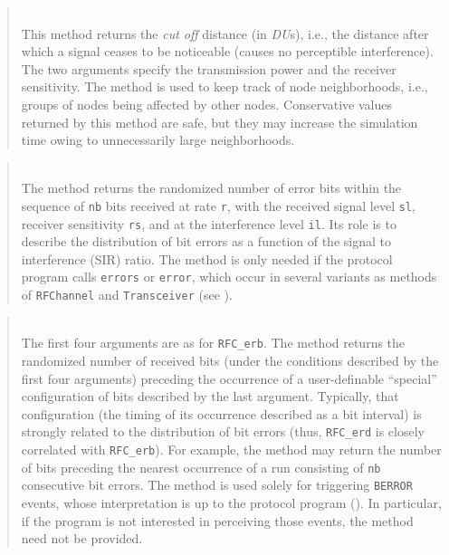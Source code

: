 \begin{quote}
\noindent{} \hspace{0in}\vspace{0.05in}\\
\noindent
This method returns the {\em cut off\/} distance (in {\em DU\/}s), i.e., the
distance after which a signal ceases to be noticeable (causes no perceptible
interference).
The two arguments specify the transmission power and the receiver sensitivity.
The method is used to keep track of node neighborhoods, i.e., groups of nodes
being affected by other nodes.
Conservative values returned by this method are safe, but they may increase
the simulation time owing to unnecessarily large neighborhoods.
\end{quote}

\begin{quote}
\noindent{} \hspace{0in}\vspace{0.05in}\\
\noindent
The method returns the randomized number of error bits within the sequence of
{\tt nb} bits received at rate {\tt r}, with the received signal level
{\tt sl}, receiver sensitivity {\tt rs}, and at the interference
level {\tt il}.
Its role is to describe the distribution of bit errors as a function of the
signal to interference (SIR) ratio.
The method is only needed if the protocol program calls
{\tt errors} or {\tt error}, which occur in several variants as methods of
{\tt RFChannel} and {\tt Transceiver} (see ).
\end{quote}

\begin{quote}
\noindent{} \hspace{0in}\vspace{0.05in}\\
\noindent
The first four arguments are as for {\tt RFC\_erb}.
The method returns the randomized number of received
bits (under the conditions described by the first four arguments)
preceding the occurrence of
a user-definable ``special''
configuration of bits described by the last argument.
Typically, that configuration
(the timing of its occurrence described as a bit interval)
is strongly related to the distribution of
bit errors (thus, {\tt RFC\_erd} is closely correlated with {\tt RFC\_erb}).
For example, the method may
return the number of bits preceding the nearest occurrence of a run consisting
of {\tt nb} consecutive bit errors.
The method is used solely
for triggering {\tt BERROR} events, whose interpretation
is up to the protocol program ().
In particular, if the program is not interested in perceiving those events,
the method need not be provided.
\end{quote}

